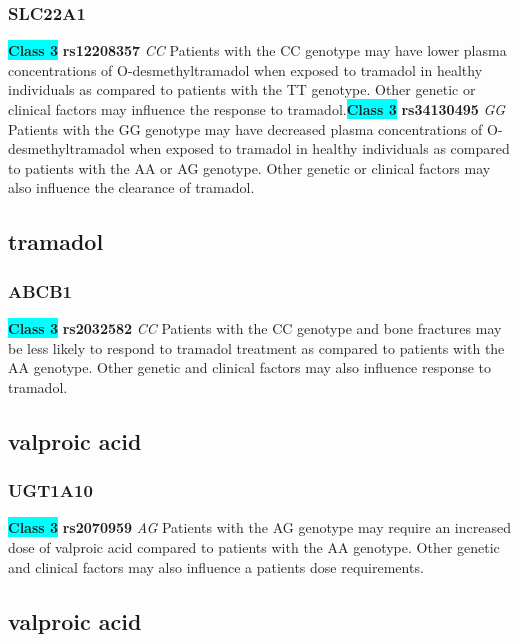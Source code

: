 \documentclass{book}
\begin{document}
\subsubsection{ SLC22A1 }

\begin{center}
\textbf{\colorbox{cyan} {Class 3}} \textbf{ rs12208357 } \textit{ CC }
Patients with the CC genotype may have lower plasma concentrations of O-desmethyltramadol when exposed to tramadol in healthy individuals as compared to patients with the TT genotype. Other genetic or clinical factors may influence the response to tramadol.\textbf{\colorbox{cyan} {Class 3}} \textbf{ rs34130495 } \textit{ GG }
Patients with the GG genotype may have decreased plasma concentrations of O-desmethyltramadol when exposed to tramadol in healthy individuals as compared to patients with the AA or AG genotype. Other genetic or clinical factors may also influence the clearance of tramadol.


\end{center}\subsection{ tramadol }


\subsubsection{ ABCB1 }

\begin{center}
\textbf{\colorbox{cyan} {Class 3}} \textbf{ rs2032582 } \textit{ CC }
Patients with the CC genotype and bone fractures may be less likely to respond to tramadol treatment as compared to patients with the AA genotype. Other genetic and clinical factors may also influence response to tramadol. 


\end{center}\subsection{ valproic acid }


\subsubsection{ UGT1A10 }

\begin{center}
\textbf{\colorbox{cyan} {Class 3}} \textbf{ rs2070959 } \textit{ AG }
Patients with the AG genotype may require an increased dose of valproic acid compared to patients with the AA genotype. Other genetic and clinical factors may also influence a patients dose requirements.


\end{center}\subsection{ valproic acid }
\end{document}
